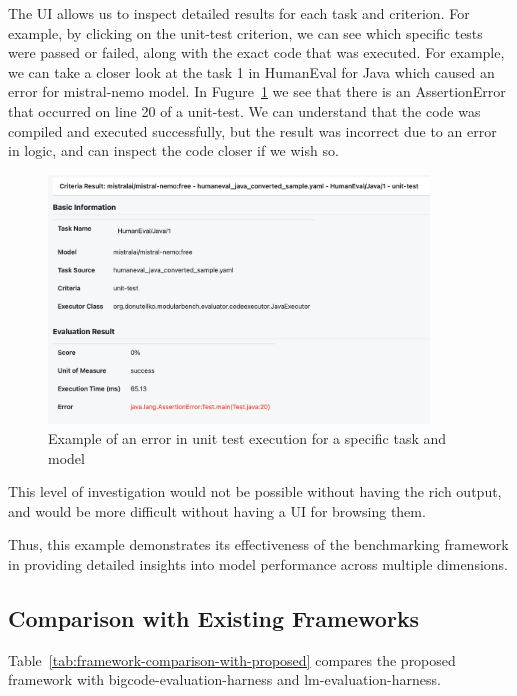 The UI allows us to inspect detailed results for each task and criterion.
For example, by clicking on the unit-test criterion, we can see which specific tests were passed or failed, along with the exact code that was executed.
For example, we can take a closer look at the task 1 in HumanEval for Java which caused an error for mistral-nemo model.
In Fugure~\ref{figure:ui_result_test_failure} we see that there is an AssertionError that occurred on line 20 of a unit-test.
We can understand that the code was compiled and executed successfully, but the result was incorrect due to an error in logic, and can inspect the code closer if we wish so.
\begin{figure}
    \centering
    \includegraphics[width=0.9\textwidth]{images/ui_result_test_failure}
    \caption{Example of an error in unit test execution for a specific task and model}
    \label{figure:ui_result_test_failure}
\end{figure}

This level of investigation would not be possible without having the rich output, and would be more difficult without having a UI for browsing them.

Thus, this example demonstrates its effectiveness of the benchmarking framework in providing detailed insights into model performance across multiple dimensions.

\subsection{Comparison with Existing Frameworks}

Table~\ref{tab:framework-comparison-with-proposed} compares the proposed framework with bigcode-evaluation-harness and lm-evaluation-harness.

